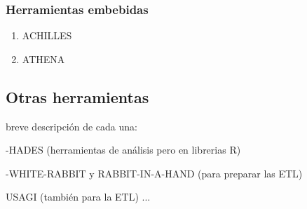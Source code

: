 \subsubsection{Herramientas embebidas}

\begin{enumerate}[label=\alph*.]

    \item ACHILLES
    \item ATHENA
    
\end{enumerate}




\subsection{Otras herramientas} \label{subsec:05otrasHerramientas}

breve descripción de cada una:

-HADES (herramientas de análisis pero en librerias R)

-WHITE-RABBIT y RABBIT-IN-A-HAND (para preparar las ETL)

USAGI (también para la ETL)
...

